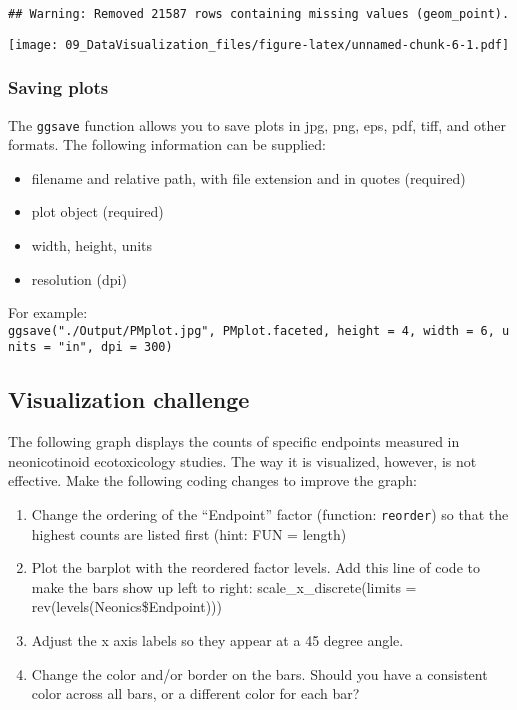 \documentclass[]{article}
\providecommand{\tightlist}{%
  \setlength{\itemsep}{0pt}\setlength{\parskip}{0pt}}
\begin{document}
\begin{verbatim}
## Warning: Removed 21587 rows containing missing values (geom_point).
\end{verbatim}

\texttt{[image: 09\_DataVisualization\_files/figure-latex/unnamed-chunk-6-1.pdf]}

\hypertarget{saving-plots}{%
\subsubsection{Saving plots}\label{saving-plots}}

The \texttt{ggsave} function allows you to save plots in jpg, png, eps,
pdf, tiff, and other formats. The following information can be supplied:

\begin{itemize}
\tightlist
\item
  filename and relative path, with file extension and in quotes
  (required)
\item
  plot object (required)
\item
  width, height, units
\item
  resolution (dpi)
\end{itemize}

For example:
\texttt{ggsave("./Output/PMplot.jpg",\ PMplot.faceted,\ height\ =\ 4,\ width\ =\ 6,\ units\ =\ "in",\ dpi\ =\ 300)}

\hypertarget{visualization-challenge}{%
\subsection{Visualization challenge}\label{visualization-challenge}}

The following graph displays the counts of specific endpoints measured
in neonicotinoid ecotoxicology studies. The way it is visualized,
however, is not effective. Make the following coding changes to improve
the graph:

\begin{enumerate}
\def\labelenumi{\arabic{enumi}.}
\tightlist
\item
  Change the ordering of the ``Endpoint'' factor (function:
  \texttt{reorder}) so that the highest counts are listed first (hint:
  FUN = length)
\item
  Plot the barplot with the reordered factor levels. Add this line of
  code to make the bars show up left to right: scale\_x\_discrete(limits
  = rev(levels(Neonics\$Endpoint)))
\item
  Adjust the x axis labels so they appear at a 45 degree angle.
\item
  Change the color and/or border on the bars. Should you have a
  consistent color across all bars, or a different color for each bar?
\end{enumerate}
\end{document}
